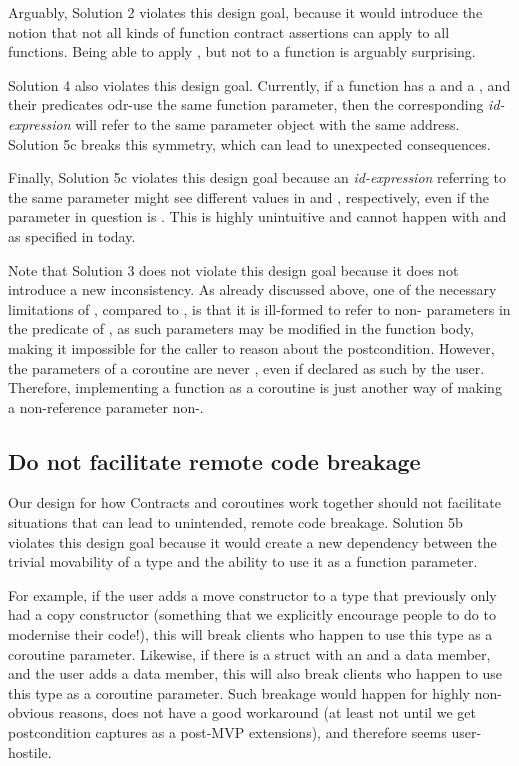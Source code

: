 Arguably, Solution 2 violates this design goal, because it would introduce the notion that not all kinds of function contract assertions can apply to all functions. Being able to apply , but not  to a function is arguably surprising.

Solution 4 also violates this design goal. Currently, if a function has a  and a , and their predicates odr-use the same function parameter, then the corresponding \emph{id-expression} will refer to the same parameter object with the same address. Solution 5c breaks this symmetry, which can lead to unexpected consequences.

Finally, Solution 5c violates this design goal because an \emph{id-expression} referring to the same parameter might see different values in  and , respectively, even if the parameter in question is . This is highly unintuitive and cannot happen with  and  as specified in \cite{P2900R8} today.

Note that Solution 3 does not violate this design goal because it does not introduce a new inconsistency. As already discussed above, one of the necessary limitations of , compared to , is that it is ill-formed to refer to non- parameters in the predicate of , as such parameters may be modified in the function body, making it impossible for the caller to reason about the postcondition. However, the parameters of a coroutine are never , even if declared as such by the user. Therefore, implementing a function as a coroutine is just another way of making a non-reference parameter non-.

\subsection{Do not facilitate remote code breakage}

Our design for how Contracts and coroutines work together should not facilitate situations that can lead to unintended, remote code breakage. Solution 5b violates this design goal because it would create a new dependency between the trivial movability of a type and the ability to use it as a function parameter.

For example, if the user adds a move constructor to a type that previously only had a copy constructor (something that we explicitly encourage people to do to modernise their code!), this will break clients who happen to use this type as a coroutine parameter. Likewise, if there is a struct with an  and a  data member, and the user adds a  data member, this will also break clients who happen to use this type as a coroutine parameter. Such breakage would happen for highly non-obvious reasons, does not have a good workaround (at least not until we get postcondition captures as a post-MVP extensions), and therefore seems user-hostile.

